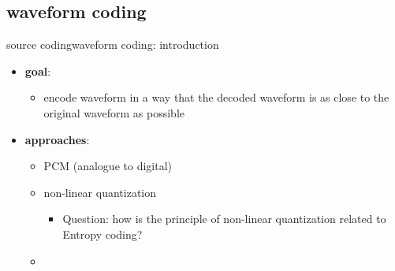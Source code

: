 \subsection{waveform coding}
	\begin{frame}{source coding}{waveform coding: introduction}
        \begin{itemize}
            \item   \textbf{goal}: 
                \begin{itemize}
                    \item   encode waveform in a way that the decoded waveform is as close to the original waveform as possible
                \end{itemize}
            \pause
            \bigskip
            \item   \textbf{approaches}:
                \begin{itemize}
                    \item   PCM (analogue to digital)
                    \pause
                    \item   non-linear quantization 
                    \pause
                        \begin{itemize}
                            \item   Question: how is the principle of non-linear quantization related to Entropy coding?
                        \end{itemize}
                    \pause
                    \item   {}
                \end{itemize}
        \end{itemize}
	\end{frame}
